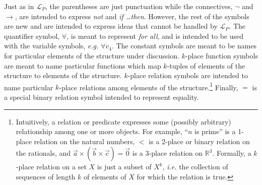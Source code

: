 \documentclass[12pt]{amsbook}
\theoremstyle{plain}
\theoremstyle{definition}
\theoremstyle{remark}
\begin{document}
Just as in $\mathcal{L}_P$,  the parentheses are just punctuation while the connectives,  $\lnot$\index{$\lnot$} and $\to$\index{$\to$},  are intended to express {\em not\/} and {\em if \dots then\/}.  However,  the rest of the symbols are new and are intended to express ideas that cannot be handled by $\mathcal{L}_P$.  The quantifier symbol,  $\forall$\index{$\forall$},  is meant to represent {\em for all\/},  and is intended to be used with the variable symbols,  {\em e.g.\/} $\forall v_4$.  The constant symbols are meant to be names for particular elements of the structure under discussion.  $k$-place function symbols are meant to name particular functions which map $k$-tuples of elements of the structure to elements of the structure.  $k$-place relation symbols are intended to name particular $k$-place relations among elements of the structure.\footnote{Intuitively,  a relation or predicate expresses some (possibly arbitrary) relationship among one or more objects.  For example,  ``$n$ is prime'' is a 1-place relation on the natural numbers,  $<$ is a 2-place or binary relation on the rationals,  and $\vec{a} \times (\vec{b} \times \vec{c}) = \vec{0}$ is a 3-place relation on $\mathbb{R}^3$.  Formally,  a $k$-place relation on a set $X$ is just a subset of $X^k$,  {\em i.e.\/} the collection of sequences of length $k$ of elements of $X$ for which the relation is true.}  Finally,  $=$\index{$=$} is a special binary relation symbol intended to represent equality.
\end{document}
